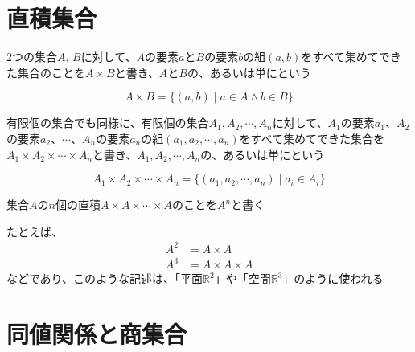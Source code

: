 \documentclass[b5paper,12pt]{jsarticle}
\begin{document}
\sectionline
\section{直積集合}

2つの集合$A, \, B$に対して、$A$の要素$a$と$B$の要素$b$の組$(a, b)$をすべて集めてできた集合のことを$A \times B$と書き、$A$と$B$の、あるいは単にという

\begin{equation*}
  A \times B = \{(a, b) \mid a \in A \land b \in B\}
\end{equation*}

有限個の集合でも同様に、有限個の集合$A_1, A_2, \cdots , A_n$に対して、$A_1$の要素$a_1$、$A_2$の要素$a_2$、$\cdots$、$A_n$の要素$a_n$の組$(a_1, a_2, \cdots , a_n)$をすべて集めてできた集合を$A_1 \times A_2 \times \cdots \times A_n$と書き、$A_1, A_2, \cdots , A_n$の、あるいは単にという

\begin{equation*}
  A_1 \times A_2 \times \cdots \times A_n = \{(a_1, a_2, \cdots , a_n) \mid a_i \in A_i\}
\end{equation*}

\sectionline

集合$A$の$n$個の直積$A \times A \times \cdots \times A$のことを$A^n$と書く

たとえば、
\begin{align*}
  A^2 & = A \times A          \\
  A^3 & = A \times A \times A
\end{align*}
などであり、このような記述は、「平面$\mathbb{R}^2$」や「空間$\mathbb{R}^3$」のように使われる

\sectionline
\section{同値関係と商集合}
\end{document}
